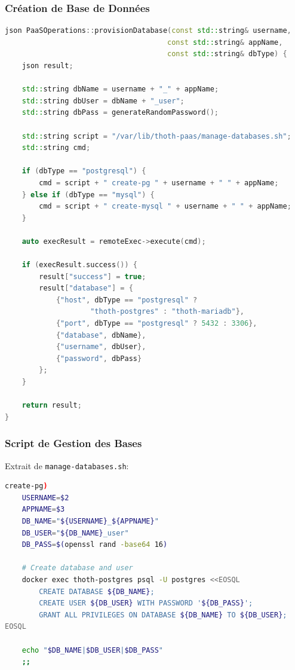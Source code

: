 \documentclass[12pt,a4paper]{article}
\begin{document}
\subsubsection{Création de Base de Données}

\begin{lstlisting}[language=C++, caption=Provisionnement de base de données]
json PaaSOperations::provisionDatabase(const std::string& username,
                                      const std::string& appName,
                                      const std::string& dbType) {
    json result;
    
    std::string dbName = username + "_" + appName;
    std::string dbUser = dbName + "_user";
    std::string dbPass = generateRandomPassword();
    
    std::string script = "/var/lib/thoth-paas/manage-databases.sh";
    std::string cmd;
    
    if (dbType == "postgresql") {
        cmd = script + " create-pg " + username + " " + appName;
    } else if (dbType == "mysql") {
        cmd = script + " create-mysql " + username + " " + appName;
    }
    
    auto execResult = remoteExec->execute(cmd);
    
    if (execResult.success()) {
        result["success"] = true;
        result["database"] = {
            {"host", dbType == "postgresql" ? 
                    "thoth-postgres" : "thoth-mariadb"},
            {"port", dbType == "postgresql" ? 5432 : 3306},
            {"database", dbName},
            {"username", dbUser},
            {"password", dbPass}
        };
    }
    
    return result;
}
\end{lstlisting}

\subsubsection{Script de Gestion des Bases}

Extrait de \texttt{manage-databases.sh}:

\begin{lstlisting}[language=bash, caption=Création base PostgreSQL]
create-pg)
    USERNAME=$2
    APPNAME=$3
    DB_NAME="${USERNAME}_${APPNAME}"
    DB_USER="${DB_NAME}_user"
    DB_PASS=$(openssl rand -base64 16)
    
    # Create database and user
    docker exec thoth-postgres psql -U postgres <<EOSQL
        CREATE DATABASE ${DB_NAME};
        CREATE USER ${DB_USER} WITH PASSWORD '${DB_PASS}';
        GRANT ALL PRIVILEGES ON DATABASE ${DB_NAME} TO ${DB_USER};
EOSQL
    
    echo "$DB_NAME|$DB_USER|$DB_PASS"
    ;;
\end{lstlisting}
\end{document}
